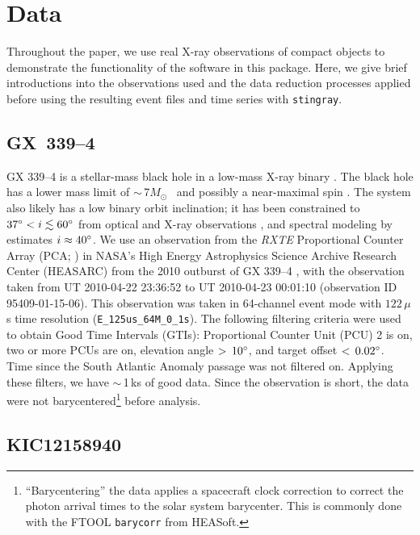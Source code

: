 \documentclass[twocolumn]{aastex62}
\newcommand{\Msun}{\ensuremath{M_\odot}\xspace}
\newcommand{\stingray}{\texttt{stingray}\xspace}
\begin{document}
\section{Data}
\label{sec:data}
Throughout the paper, we use real X-ray observations of compact objects to demonstrate the functionality of the software in this package. 
Here, we give brief introductions into the observations used and the data reduction processes applied before using the resulting event files and time series with \stingray.

\subsection{GX~339--4}
\label{sec:gx339}
GX 339--4 is a stellar-mass black hole in a low-mass X-ray binary \citep{Hynesetal03}. 
The black hole has a lower mass limit of $\sim$\,7\Msun\ \citep{MunozDariasetal08} and possibly a near-maximal spin \citep{Ludlametal15}. 
The system also likely has a low binary orbit inclination; it has been constrained to $37 \degree <i\lesssim 60\degree$ from optical and X-ray observations \citep{Heidaetal17, Zdziarskietal98}, and spectral modeling by \citet{WangJietal18} estimates $i\approx 40\degree$.
We use an observation from the  \textit{RXTE} Proportional Counter Array (PCA; \citealt{Jahodaetal96}) in NASA's High Energy Astrophysics Science Archive Research Center (HEASARC) from the 2010 outburst of GX 339--4 \citep{Yamaokaetal10}, with the observation taken from UT 2010-04-22 23:36:52 to UT 2010-04-23 00:01:10 (observation ID 95409-01-15-06).
This observation was taken in 64-channel event mode with $122\,\mu$s time resolution (\texttt{E\_125us\_64M\_0\_1s}).
The following filtering criteria were used to obtain Good Time Intervals (GTIs): Proportional Counter Unit (PCU) 2 is on, two or more PCUs are on, elevation angle $>\,10\degree$, and target offset $<\,0.02\degree$. 
Time since the South Atlantic Anomaly passage was not filtered on. 
Applying these filters, we have $\sim$\,1\,ks of good data. 
Since the observation is short, the data were not barycentered\footnote{\label{foot:bary} ``Barycentering'' the data applies a spacecraft clock correction to correct the photon arrival times to the solar system barycenter. This is commonly done with the FTOOL \texttt{barycorr} from HEASoft.} before analysis.

\subsection{KIC12158940}
\label{sec:kepleragn}
\end{document}
